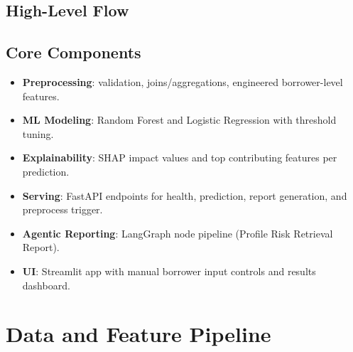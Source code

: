 \documentclass[12pt,a4paper]{article}
\begin{document}
\subsection{High-Level Flow}
\begin{center}
\end{center}

\subsection{Core Components}
\begin{itemize}[leftmargin=1.5em]
  \item \textbf{Preprocessing}: validation, joins/aggregations, engineered borrower-level features.
  \item \textbf{ML Modeling}: Random Forest and Logistic Regression with threshold tuning.
  \item \textbf{Explainability}: SHAP impact values and top contributing features per prediction.
  \item \textbf{Serving}: FastAPI endpoints for health, prediction, report generation, and preprocess trigger.
  \item \textbf{Agentic Reporting}: LangGraph node pipeline (Profile \textrightarrow{} Risk \textrightarrow{} Retrieval \textrightarrow{} Report).
  \item \textbf{UI}: Streamlit app with manual borrower input controls and results dashboard.
\end{itemize}

\section{Data and Feature Pipeline}
\end{document}
